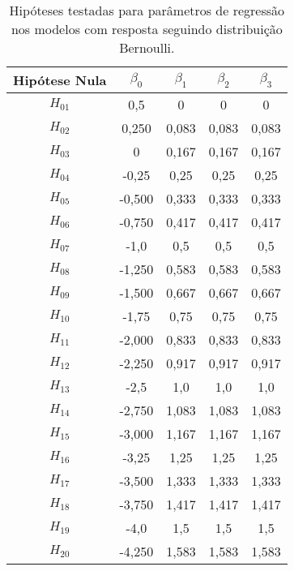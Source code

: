 
\begin{table}[H]
\centering
\begin{tabular}{c|cccc}
\hline
Hipótese Nula & $\beta_0$ & $\beta_1$ & $\beta_2$ & $\beta_3$ \\ \hline
$H_{01}$      & 0,5       & 0         & 0         & 0         \\
$H_{02}$      & 0,250     & 0,083     & 0,083     & 0,083     \\
$H_{03}$      & 0         & 0,167     & 0,167     & 0,167     \\
$H_{04}$      & -0,25     & 0,25      & 0,25      & 0,25      \\
$H_{05}$      & -0,500    & 0,333     & 0,333     & 0,333     \\
$H_{06}$      & -0,750    & 0,417     & 0,417     & 0,417     \\
$H_{07}$      & -1,0      & 0,5       & 0,5       & 0,5       \\
$H_{08}$      & -1,250    & 0,583     & 0,583     & 0,583     \\
$H_{09}$      & -1,500    & 0,667     & 0,667     & 0,667     \\
$H_{10}$      & -1,75     & 0,75      & 0,75      & 0,75      \\
$H_{11}$      & -2,000    & 0,833     & 0,833     & 0,833     \\
$H_{12}$      & -2,250    & 0,917     & 0,917     & 0,917     \\
$H_{13}$      & -2,5      & 1,0       & 1,0       & 1,0       \\
$H_{14}$      & -2,750    & 1,083     & 1,083     & 1,083     \\
$H_{15}$      & -3,000    & 1,167     & 1,167     & 1,167     \\
$H_{16}$      & -3,25     & 1,25      & 1,25      & 1,25      \\
$H_{17}$      & -3,500    & 1,333     & 1,333     & 1,333     \\
$H_{18}$      & -3,750    & 1,417     & 1,417     & 1,417     \\
$H_{19}$      & -4,0      & 1,5       & 1,5       & 1,5       \\
$H_{20}$      & -4,250    & 1,583     & 1,583     & 1,583     \\ \hline
\end{tabular}
\caption{Hipóteses testadas para parâmetros de regressão nos modelos com resposta seguindo distribuição Bernoulli.}
\label{tab:hipoteses_beta_bernoulli}
\end{table}

